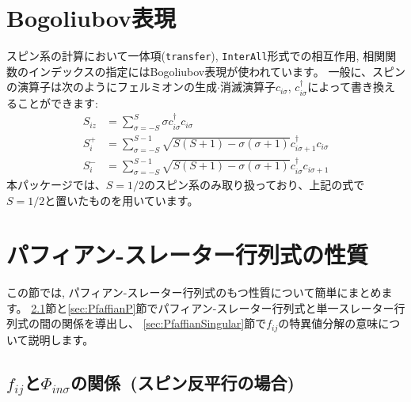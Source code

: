 \section{Bogoliubov表現}\label{sec_bogoliubov_rep}

スピン系の計算において一体項(\verb|transfer|), \verb|InterAll|形式での相互作用, 
相関関数のインデックスの指定にはBogoliubov表現が使われています。
一般に、スピンの演算子は次のようにフェルミオンの生成$\cdot$消滅演算子$c_{i \sigma}$,
$c_{i \sigma}^\dagger$によって書き換えることができます:
\begin{align}
  S_{i z} &= \sum_{\sigma = -S}^{S} \sigma c_{i \sigma}^\dagger c_{i \sigma}
  \\
  S_{i}^+ &= \sum_{\sigma = -S}^{S-1} 
  \sqrt{S(S+1) - \sigma(\sigma+1)} 
  c_{i \sigma+1}^\dagger c_{i \sigma}
  \\
  S_{i}^- &= \sum_{\sigma = -S}^{S-1} 
  \sqrt{S(S+1) - \sigma(\sigma+1)} 
  c_{i \sigma}^\dagger c_{i \sigma+1}
\end{align}
本パッケージでは、$S=1/2$のスピン系のみ取り扱っており、上記の式で
$S=1/2$と置いたものを用いています。

\section{{パフィアン-スレーター行列式の性質}}
\label{sec:PuffAndSlater}

この節では, パフィアン-スレーター行列式のもつ性質について簡単にまとめます。
\ref{sec:PfaffianAP}節と\ref{sec:PfaffianP}節でパフィアン-スレーター行列式と単一スレーター行列式の間の関係を導出し、
\ref{sec:PfaffianSingular}節で$f_{ij}$の特異値分解の意味について説明します。

\subsection{$f_{ij}$と$\Phi_{in\sigma}$の関係~(スピン反平行の場合)}
\label{sec:PfaffianAP}

